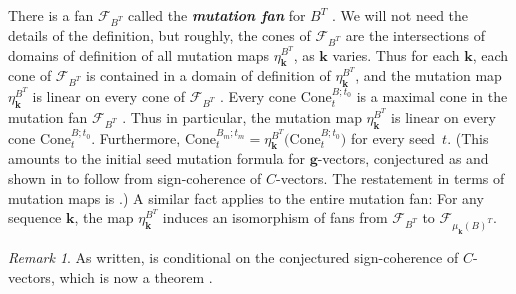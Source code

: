 \documentclass{amsart}
\theoremstyle{definition}
\theoremstyle{remark}
\newtheorem{remark}[proposition]{Remark}
\numberwithin{equation}{section}
\newcommand{\newword}[1]{\textbf{\emph{#1}}}
\newcommand{\F}{{\mathcal F}}
\newcommand{\0}{{\mathbf{0}}}
\newcommand{\Cone}{\mathrm{Cone}}
\newcommand{\g}{\mathbf{g}}
\newcommand{\kk}{\mathbf{k}}
\begin{document}
There is a fan $\F_{B^T}$ called the \newword{mutation fan} for $B^T$ \cite[Definition~5.12]{universal}.
We will not need the details of the definition, but roughly, the cones of $\F_{B^T}$ are the intersections of domains of definition of all mutation maps $\eta_\kk^{B^T}$, as $\kk$ varies.
Thus for each $\kk$, each cone of $\F_{B^T}$ is contained in a domain of definition of $\eta_\kk^{B^T}$, and the mutation map $\eta_\kk^{B^T}$ is linear on every cone of $\F_{B^T}$ \cite[Proposition~5.3]{universal}.
Every cone $\Cone^{B;t_0}_t$ is a maximal cone in the mutation fan $\F_{B^T}$ \cite[Proposition~8.13]{universal}.
Thus in particular, the mutation map $\eta_\kk^{B^T}$ is linear on every cone $\Cone^{B;t_0}_t$.
Furthermore, $\Cone_t^{B_m;t_m}=\eta_\kk^{B^T}\bigl(\Cone_t^{B;t_0}\bigr)$ for every seed~$t$.
(This amounts to the initial seed mutation formula for $\g$-vectors, conjectured as \cite[Conjecture~7.12]{FZ07} and shown in \cite[Proposition~4.2(v)]{NZ12} to follow from sign-coherence of $C$-vectors.
The restatement in terms of mutation maps is \cite[Conjecture~8.11]{universal}.)
A similar fact applies to the entire mutation fan:
For any sequence $\kk$, the map $\eta_\kk^{B^T}$ induces an isomorphism of fans \cite[Proposition~7.3]{universal} from $\F_{B^T}$ to $\F_{\mu_\kk(B)^T}$.

\begin{remark}\label{conditional}
As written, \cite[Proposition~8.13]{universal} is conditional on the conjectured sign-coherence of $C$-vectors, which is now a theorem \cite[Corollary~5.5]{GHKK18}.
\end{remark}
\end{document}
